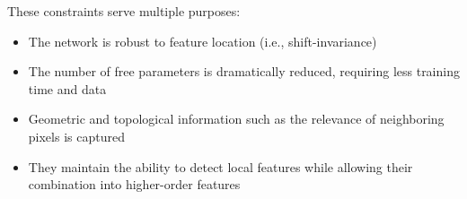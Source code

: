 \documentclass[10pt]{article}
\begin{document}
These constraints serve multiple purposes:
\begin{itemize}
    \item The network is robust to feature location (i.e., shift-invariance)
    \item The number of free parameters is dramatically reduced, requiring less training time and data
    \item Geometric and topological information such as the relevance of neighboring pixels is captured
    \item They maintain the ability to detect local features while allowing their combination into higher-order features
\end{itemize}






\end{document}

